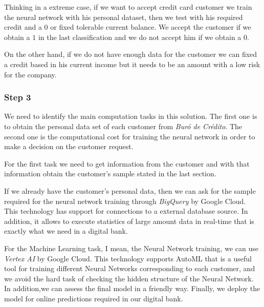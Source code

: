 \documentclass[11pt]{article}
\begin{document}
Thinking in a extreme case, if we want to accept credit card customer we
train the neural network with his personal dataset, then we test with
his required credit and a 0 or fixed tolerable current balance. We
accept the customer if we obtain a \(1\) in the last classification and
we do not accept him if we obtain a \(0\).

On the other hand, if we do not have enough data for the customer we can
fixed a credit based in his current income but it needs to be an amount
with a low risk for the company.

    \hypertarget{step-3}{%
\subsubsection{Step 3}\label{step-3}}

We need to identify the main computation tasks in this solution. The
first one is to obtain the personal data set of each customer from
\emph{Buró de Crédito}. The second one is the computational cost for
training the neural network in order to make a decision on the customer
request.

For the first task we need to get information from the customer and with
that information obtain the customer's sample stated in the last
section.

If we already have the customer's personal data, then we can ask for the
sample required for the neural network training through \emph{BigQuery}
by Google Cloud. This technology has support for connections to a
external database source. In addition, it allows to execute statistics
of large amount data in real-time that is exactly what we need in a
digital bank.

For the Machine Learning task, I mean, the Neural Network training, we
can use \emph{Vertex AI} by Google Cloud. This technology supports
AutoML that is a useful tool for training different Neural Networks
corresponding to each customer, and we avoid the hard task of checking
the hidden structure of the Neural Network. In addition,we can assess
the final model in a friendly way. Finally, we deploy the model for
online predictions required in our digital bank.


    
    
    
\end{document}
